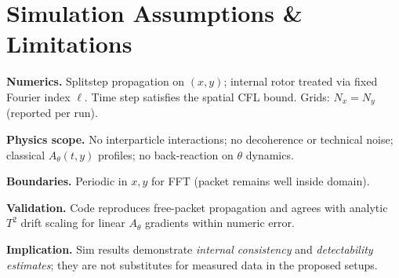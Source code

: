 \section*{Simulation Assumptions \& Limitations}
\begin{tcolorbox}
\textbf{Numerics.} Split\textendash step propagation on $(x,y)$; internal rotor treated via fixed Fourier index $\ell$.
Time step satisfies the spatial CFL bound. Grids: $N_x{=}N_y$ (reported per run).

\textbf{Physics scope.} No interparticle interactions; no decoherence or technical noise; classical $A_\theta(t,y)$ profiles; no back-reaction on $\theta$ dynamics.

\textbf{Boundaries.} Periodic in $x,y$ for FFT (packet remains well inside domain). 

\textbf{Validation.} Code reproduces free-packet propagation and agrees with analytic $T^2$ drift scaling for linear $A_\theta$ gradients within numeric error.

\textbf{Implication.} Sim results demonstrate \emph{internal consistency} and \emph{detectability estimates}; they are not substitutes for measured data in the proposed setups.
\end{tcolorbox}
